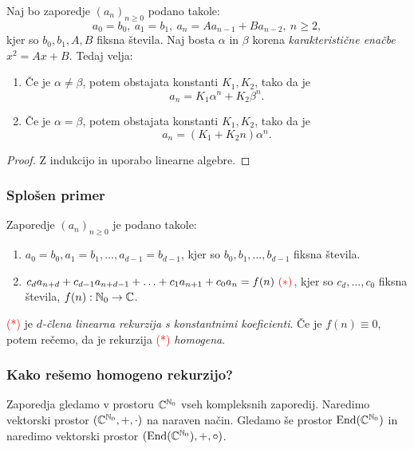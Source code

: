 \begin{izrek}
    Naj bo zaporedje $(a_n)_{n \geq 0}$ podano takole:
    $$a_0 = b_0, \ a_1 = b_1, \ a_n = A a_{n-1} + B a_{n-2}, \ n \geq 2,$$
    kjer so $b_0, b_1, A, B$ fiksna števila. 
    Naj bosta $\alpha$ in $\beta$ korena \emph{karakteristične enačbe} $x^2 = Ax + B$. Tedaj velja:
    \begin{enumerate}
        \item Če je $\alpha \neq \beta$, potem obstajata konstanti $K_1, K_2$, tako da je 
        $$a_n = K_1 \alpha^n + K_2 \beta^n.$$
        \item Če je $\alpha = \beta$, potem obstajata konstanti $K_1, K_2$, tako da je 
        $$a_n = (K_1 + K_2n) \alpha^n.$$     
    \end{enumerate}
\end{izrek}

\begin{proof}
    Z indukcijo in uporabo linearne algebre.
\end{proof}

\subsubsection*{Splošen primer}
Zaporedje $(a_n)_{n \geq 0}$ je podano takole:
\begin{enumerate}
    \item $a_0 = b_0, a_1 = b_1, \ldots, a_{d-1} = b_{d-1}$, kjer so $b_0, b_1, \ldots, b_{d-1}$ fiksna števila.
    \item $c_da_{n+d} + c_{d-1}a_{n+d-1} + \ldots + c_1 a _{n+1} + c_0 a_n = f(n) \ \textcolor{red}{(*)}$, kjer so $c_d, \ldots, c_0$ fiksna števila, $f(n): \mathbb{N}_0 \to \mathbb{C}$.
\end{enumerate}

\begin{definicija}
    \textcolor{red}{(*)} je \emph{$d$-člena linearna rekurzija s konstantnimi koeficienti}. Če je $f(n) \equiv 0$, potem rečemo, da je rekurzija \textcolor{red}{(*)} \emph{homogena}.
\end{definicija}

\subsubsection*{Kako rešemo homogeno rekurzijo?}
Zaporedja gledamo v prostoru $\mathbb{C}^{\mathbb{N}_0}$ vseh kompleksnih zaporedij. Naredimo vektorski prostor $(\mathbb{C}^{\mathbb{N}_0}, +, \cdot)$ na naraven način. Gledamo še prostor $\operatorname{End}(\mathbb{C}^{\mathbb{N}_0})$ in naredimo vektorski prostor $(\operatorname{End}(\mathbb{C}^{\mathbb{N}_0}), +, \circ)$.


